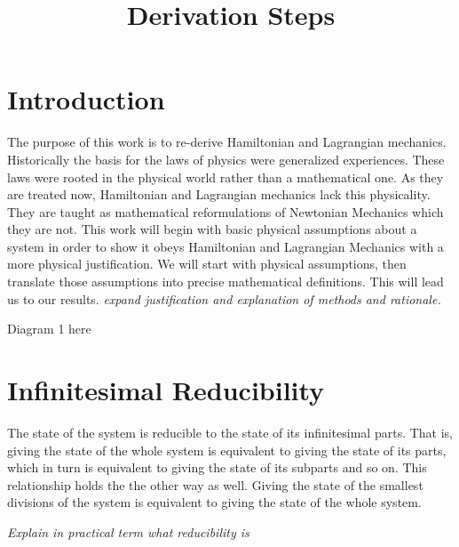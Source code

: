 \documentclass{article}
\begin{document}
\title{Derivation Steps}

\section{Introduction}

	The purpose of this work is to re-derive Hamiltonian and Lagrangian mechanics. Historically the basis for the laws of physics were generalized experiences. These laws were rooted in the physical world rather than a mathematical one. As they are treated now, Hamiltonian and Lagrangian mechanics lack this physicality. They are taught as mathematical reformulations of Newtonian Mechanics which they are not. This work will begin with basic physical assumptions about a system in order to show it obeys Hamiltonian and Lagrangian Mechanics with a more physical justification. We will start with physical assumptions, then translate those assumptions into precise mathematical definitions. This will lead us to our results. \emph{expand justification and explanation of methods and rationale.}
	
Diagram 1 here

\section{Infinitesimal Reducibility}
	
\begin{assump}
	The state of the system is reducible to the state of its infinitesimal parts. That is, giving the state of the whole system is equivalent to giving the state of its parts, which in turn is equivalent to giving the state of its subparts and so on. This relationship holds the the other way as well. Giving the state of the smallest divisions of the system is equivalent to giving the state of the whole system.
\end{assump}

	
	\emph{Explain in practical term what reducibility is}
	
\end{document}
